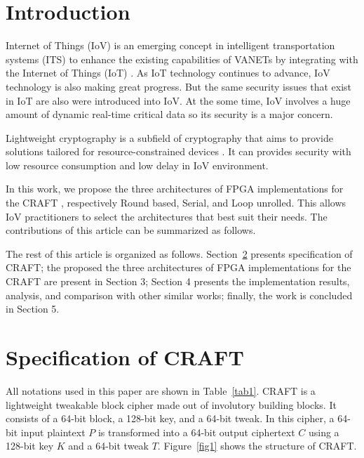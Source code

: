 \documentclass[final,5p,times,twocolumn]{elsarticle}
\begin{document}



\section{Introduction}\label{sec1}

Internet of Things  (IoV) is an emerging concept in intelligent transportation systems (ITS) to enhance the existing capabilities of VANETs by integrating with the Internet of Things (IoT) \cite{sharma2019survey}.
As IoT technology continues to advance, IoV technology is also making great progress.
But the same security issues that exist in IoT are also were introduced into IoV.
At the some time, IoV involves a huge amount of dynamic real-time critical data so its security is a major concern.

Lightweight cryptography is a subfield of cryptography that aims to provide solutions tailored for resource-constrained devices \cite{mckay2016report}.
It can provides security with low resource consumption and low delay in IoV environment.

In this work, we propose the three architectures of FPGA implementations for the CRAFT \cite{beierle2019craft}, respectively Round based, Serial, and Loop unrolled.
This allows IoV practitioners to select the architectures that best suit their needs.
The contributions of this article can be summarized as follows.

The rest of this article is organized as follows.
Section~\ref{sec2} presents specification of CRAFT; the proposed the three architectures of FPGA implementations for the CRAFT are present in Section 3; Section 4 presents the implementation results, analysis, and comparison with other similar works; finally, the work is concluded in Section 5.

\section{Specification of CRAFT}\label{sec2}

All notations used in this paper are shown in Table~\ref{tab1}.
CRAFT is a lightweight tweakable block cipher made out of involutory building blocks.
It consists of a 64-bit block, a 128-bit key, and a 64-bit tweak. In this cipher, a 64-bit input plaintext $P$ is transformed into a 64-bit output ciphertext $C$ using a 128-bit key $K$ and a 64-bit tweak $T$. Figure~\ref{fig1} shows the structure of CRAFT.
\end{document}

